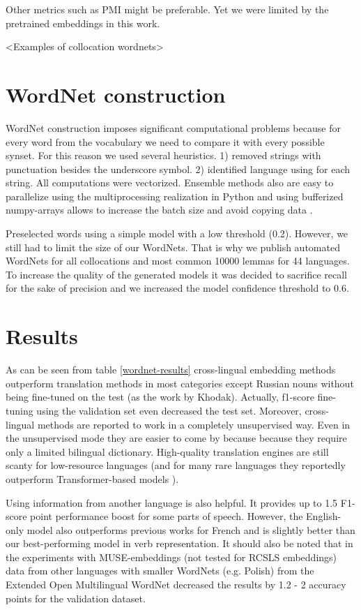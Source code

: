 \documentclass[11pt,a4paper]{article}
\begin{document}
Other metrics such as PMI \cite{bouma2009normalized} might be preferable. Yet we were limited by the pretrained embeddings in this work.

<Examples of collocation wordnets>
\section{WordNet construction}
WordNet construction imposes significant computational problems because for every word from the vocabulary we need to compare it with every possible synset. For this reason we used several heuristics. 1) removed strings with punctuation besides the underscore symbol. 2) identified language using \cite{Joulin2016} for each string. All computations were vectorized. Ensemble methods also are easy to parallelize using the multiprocessing realization in Python and using bufferized numpy-arrays allows to increase the batch size and avoid copying data \cite{gorelick2014high}.

Preselected words using a simple model with a low threshold (0.2). However, we still had to limit the size of our WordNets. That is why we publish automated WordNets for all collocations and most common 10000 lemmas for 44 languages. To increase the quality of the generated models it was decided to sacrifice recall for the sake of precision and we increased the model confidence threshold to 0.6.
\section{Results}

As can be seen from table \ref{wordnet-results} cross-lingual embedding methods outperform translation methods in most categories except Russian nouns without being fine-tuned on the test (as the work by Khodak). Actually, f1-score fine-tuning using the validation set even decreased the test set. Moreover, cross-lingual methods are reported to work in a completely unsupervised way. Even in the unsupervised mode they are easier to come by because because they require only a limited bilingual dictionary. High-quality translation engines are still scanty for low-resource languages (and for many rare languages they reportedly outperform Transformer-based models \cite{laser}).

Using information from another language is also helpful. It provides up to 1.5 F1-score point performance boost for some parts of speech. However, the English-only model also outperforms previous works for French and is slightly better than our best-performing model in verb representation. It should also be noted that in the experiments with MUSE-embeddings (not tested for RCSLS embeddings) data from other languages with smaller WordNets (e.g. Polish) from the Extended Open Multilingual WordNet decreased the results by 1.2 - 2 accuracy points for the validation dataset.
\end{document}
